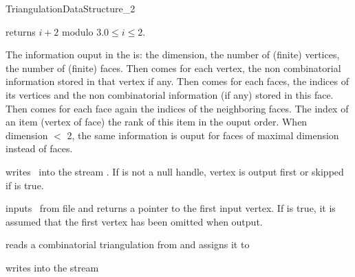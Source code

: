 \begin{ccRefConcept}{TriangulationDataStructure_2}

\ccGlue
{}
{returns $i+2$ modulo 3.\ccPrecond $0\leq i \leq 2$.}
\ccGlue
{}


The information ouput  in the  is: 
the dimension, the number of (finite) vertices, 
the number of (finite) faces.
Then comes 
for each vertex, the non combinatorial information stored in  that vertex
if any.
Then comes 
for each faces,  the indices of its vertices and 
the non combinatorial information (if any) stored in  this face.
Then comes 
for each face again 
 the indices of the neighboring faces. 
The  index of an item  (vertex of face)
the rank of this item in the ouput order.
When dimension $<$ 2, the same information is ouput
for faces of maximal dimension instead of faces.


{writes \ccVar\ into the stream . 
If  is not a null handle, vertex 
is output first or skipped if  is true.}

{inputs \ccVar\ from file and returns a pointer to the first input vertex.
  If  is true, it is assumed that the first
   vertex has been omitted when output.}

{reads a combinatorial triangulation from  and assigns it to }

{writes  into the stream }




\ccHasModels
{} \\

\ccSeeAlso
{} \\
 \\

\end{ccRefConcept}


